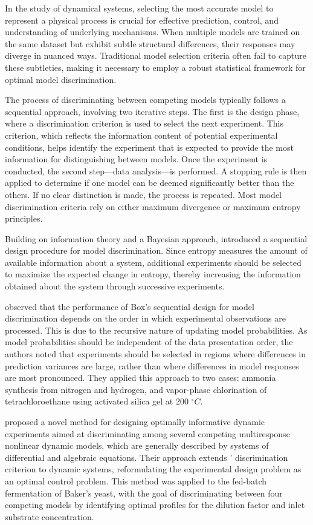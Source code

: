 \documentclass[../Article_Sensitivity_Analsysis.tex]{subfiles}
\begin{document}
	
	In the study of dynamical systems, selecting the most accurate model to represent a physical process is crucial for effective prediction, control, and understanding of underlying mechanisms. When multiple models are trained on the same dataset but exhibit subtle structural differences, their responses may diverge in nuanced ways. Traditional model selection criteria often fail to capture these subtleties, making it necessary to employ a robust statistical framework for optimal model discrimination.
	
	The process of discriminating between competing models typically follows a sequential approach, involving two iterative steps. The first is the design phase, where a discrimination criterion is used to select the next experiment. This criterion, which reflects the information content of potential experimental conditions, helps identify the experiment that is expected to provide the most information for distinguishing between models. Once the experiment is conducted, the second step—data analysis—is performed. A stopping rule is then applied to determine if one model can be deemed significantly better than the others. If no clear distinction is made, the process is repeated. Most model discrimination criteria rely on either maximum divergence or maximum entropy principles.
	
	Building on information theory and a Bayesian approach, \citet{Box1967} introduced a sequential design procedure for model discrimination. Since entropy measures the amount of available information about a system, additional experiments should be selected to maximize the expected change in entropy, thereby increasing the information obtained about the system through successive experiments.
	
	\citet{BuzziFerraris1983} observed that the performance of Box’s sequential design for model discrimination depends on the order in which experimental observations are processed. This is due to the recursive nature of updating model probabilities. As model probabilities should be independent of the data presentation order, the authors noted that experiments should be selected in regions where differences in prediction variances are large, rather than where differences in model responses are most pronounced. They applied this approach to two cases: ammonia synthesis from nitrogen and hydrogen, and vapor-phase chlorination of tetrachloroethane using activated silica gel at 200 $^\circ C$.
	
	\citet{Chen2003} proposed a novel method for designing optimally informative dynamic experiments aimed at discriminating among several competing multiresponse nonlinear dynamic models, which are generally described by systems of differential and algebraic equations. Their approach extends \citet{BuzziFerraris1983}' discrimination criterion to dynamic systems, reformulating the experimental design problem as an optimal control problem. This method was applied to the fed-batch fermentation of Baker's yeast, with the goal of discriminating between four competing models by identifying optimal profiles for the dilution factor and inlet substrate concentration.
	
\end{document}
